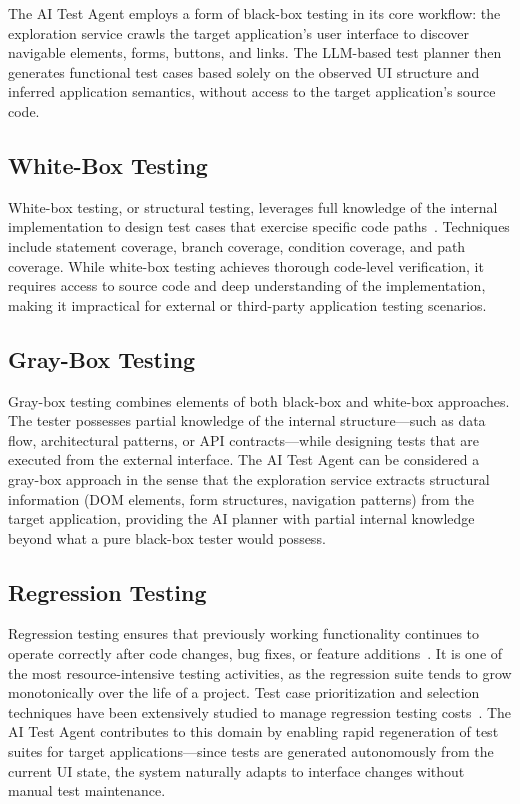 The AI Test Agent employs a form of black-box testing in its core workflow:
the exploration service crawls the target application's user interface to
discover navigable elements, forms, buttons, and links. The LLM-based test
planner then generates functional test cases based solely on the observed
UI structure and inferred application semantics, without access to the
target application's source code.

\subsection{White-Box Testing}
\label{subsec:white_box}

White-box testing, or structural testing, leverages full knowledge of the
internal implementation to design test cases that exercise specific code
paths~\cite{myers2011art}. Techniques include statement coverage, branch
coverage, condition coverage, and path coverage. While white-box testing
achieves thorough code-level verification, it requires access to source
code and deep understanding of the implementation, making it impractical
for external or third-party application testing scenarios.

\subsection{Gray-Box Testing}
\label{subsec:gray_box}

Gray-box testing combines elements of both black-box and white-box
approaches. The tester possesses partial knowledge of the internal
structure---such as data flow, architectural patterns, or API
contracts---while designing tests that are executed from the external
interface. The AI Test Agent can be considered a gray-box approach in
the sense that the exploration service extracts structural information
(DOM elements, form structures, navigation patterns) from the
target application, providing the AI planner with partial internal
knowledge beyond what a pure black-box tester would possess.

\subsection{Regression Testing}
\label{subsec:regression}

Regression testing ensures that previously working functionality continues
to operate correctly after code changes, bug fixes, or feature
additions~\cite{istqb2023}. It is one of the most resource-intensive
testing activities, as the regression suite tends to grow monotonically
over the life of a project. Test case prioritization and selection
techniques have been extensively studied to manage regression testing
costs~\cite{aniche2022testing}. The AI Test Agent contributes to this
domain by enabling rapid regeneration of test suites for target
applications---since tests are generated autonomously from the current
UI state, the system naturally adapts to interface changes without
manual test maintenance.

